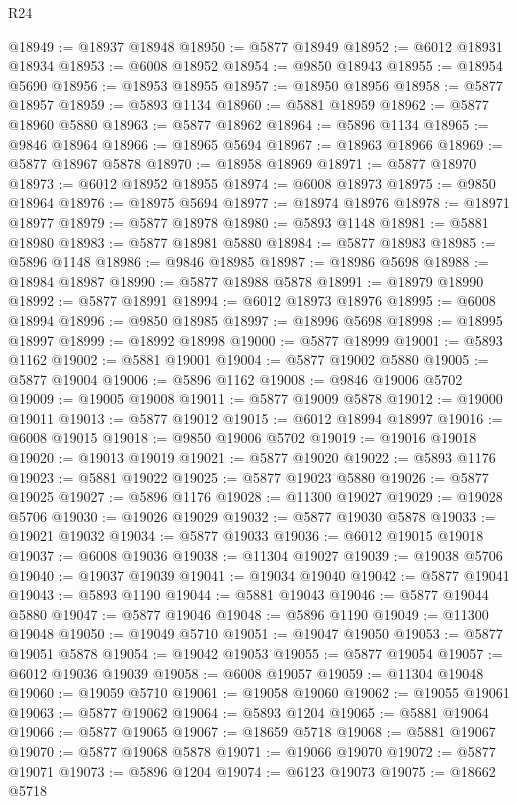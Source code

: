 \begin{lexlean}{R24}
\begin{coremodule}
@18949 := @18937 @18948
@18950 := @5877 @18949
@18952 := @6012 @18931 @18934
@18953 := @6008 @18952
@18954 := @9850 @18943
@18955 := @18954 @5690
@18956 := @18953 @18955
@18957 := @18950 @18956
@18958 := @5877 @18957
@18959 := @5893 @1134
@18960 := @5881 @18959
@18962 := @5877 @18960 @5880
@18963 := @5877 @18962
@18964 := @5896 @1134
@18965 := @9846 @18964
@18966 := @18965 @5694
@18967 := @18963 @18966
@18969 := @5877 @18967 @5878
@18970 := @18958 @18969
@18971 := @5877 @18970
@18973 := @6012 @18952 @18955
@18974 := @6008 @18973
@18975 := @9850 @18964
@18976 := @18975 @5694
@18977 := @18974 @18976
@18978 := @18971 @18977
@18979 := @5877 @18978
@18980 := @5893 @1148
@18981 := @5881 @18980
@18983 := @5877 @18981 @5880
@18984 := @5877 @18983
@18985 := @5896 @1148
@18986 := @9846 @18985
@18987 := @18986 @5698
@18988 := @18984 @18987
@18990 := @5877 @18988 @5878
@18991 := @18979 @18990
@18992 := @5877 @18991
@18994 := @6012 @18973 @18976
@18995 := @6008 @18994
@18996 := @9850 @18985
@18997 := @18996 @5698
@18998 := @18995 @18997
@18999 := @18992 @18998
@19000 := @5877 @18999
@19001 := @5893 @1162
@19002 := @5881 @19001
@19004 := @5877 @19002 @5880
@19005 := @5877 @19004
@19006 := @5896 @1162
@19008 := @9846 @19006 @5702
@19009 := @19005 @19008
@19011 := @5877 @19009 @5878
@19012 := @19000 @19011
@19013 := @5877 @19012
@19015 := @6012 @18994 @18997
@19016 := @6008 @19015
@19018 := @9850 @19006 @5702
@19019 := @19016 @19018
@19020 := @19013 @19019
@19021 := @5877 @19020
@19022 := @5893 @1176
@19023 := @5881 @19022
@19025 := @5877 @19023 @5880
@19026 := @5877 @19025
@19027 := @5896 @1176
@19028 := @11300 @19027
@19029 := @19028 @5706
@19030 := @19026 @19029
@19032 := @5877 @19030 @5878
@19033 := @19021 @19032
@19034 := @5877 @19033
@19036 := @6012 @19015 @19018
@19037 := @6008 @19036
@19038 := @11304 @19027
@19039 := @19038 @5706
@19040 := @19037 @19039
@19041 := @19034 @19040
@19042 := @5877 @19041
@19043 := @5893 @1190
@19044 := @5881 @19043
@19046 := @5877 @19044 @5880
@19047 := @5877 @19046
@19048 := @5896 @1190
@19049 := @11300 @19048
@19050 := @19049 @5710
@19051 := @19047 @19050
@19053 := @5877 @19051 @5878
@19054 := @19042 @19053
@19055 := @5877 @19054
@19057 := @6012 @19036 @19039
@19058 := @6008 @19057
@19059 := @11304 @19048
@19060 := @19059 @5710
@19061 := @19058 @19060
@19062 := @19055 @19061
@19063 := @5877 @19062
@19064 := @5893 @1204
@19065 := @5881 @19064
@19066 := @5877 @19065
@19067 := @18659 @5718
@19068 := @5881 @19067
@19070 := @5877 @19068 @5878
@19071 := @19066 @19070
@19072 := @5877 @19071
@19073 := @5896 @1204
@19074 := @6123 @19073
@19075 := @18662 @5718

\end{coremodule}
\end{lexlean}
